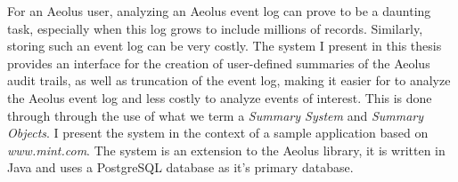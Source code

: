 % 
% 
%
For an Aeolus user, analyzing an Aeolus event log can prove to be a daunting task, especially when this log grows to include millions of records. Similarly, storing such an event log can be very costly. The system I present in this thesis provides an interface for the creation of user-defined summaries of the Aeolus audit trails, as well as truncation of the event log, making it easier for to analyze the Aeolus event log and less costly to analyze events of interest. This is done through through the use of what we term a \emph{Summary System} and \emph{Summary Objects}.
I present the system in the context of a sample application based on \emph{www.mint.com}. The system is an extension to the Aeolus library, it is written in Java and uses a PostgreSQL database as it's primary database.

